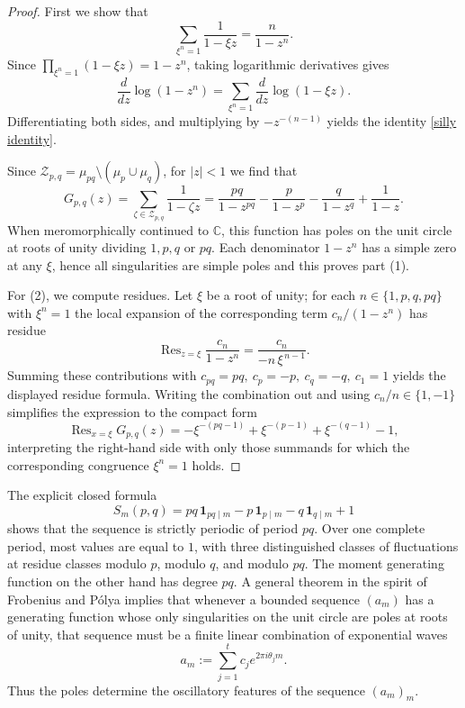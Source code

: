 \documentclass[table]{amsart}
\numberwithin{equation}{section}
\begin{document}
\begin{proof}

\par First we show that \begin{equation}\label{silly identity}
\sum_{\xi^n=1}\frac{1}{1-\xi z}=\frac{n}{1-z^n}.
\end{equation} Since $\prod_{\xi^n=1}(1-\xi z)=1-z^n$, taking logarithmic derivatives gives
\[
\frac{d}{dz}\log(1-z^n)=\sum_{\xi^n=1}\frac{d}{dz}\log(1-\xi z).
\]
Differentiating both sides, and multiplying by \(-z^{-(n-1)}\) yields the identity \eqref{silly identity}.
\par Since
\(\mathcal{Z}_{p,q}=\mu_{pq}\setminus(\mu_p\cup\mu_q)\), for \(|z|<1\) we find that
\[
G_{p,q}(z)=\sum_{\zeta\in\mathcal{Z}_{p,q}}\frac{1}{1-\zeta z}
=\frac{pq}{1-z^{pq}}-\frac{p}{1-z^p}-\frac{q}{1-z^q}+\frac{1}{1-z}.
\]When meromorphically continued to $\mathbb{C}$, this function has poles on the unit circle at roots of unity dividing \(1,p,q\) or \(pq\). Each denominator \(1-z^n\) has a simple zero at any \(\xi\), hence all singularities are simple poles and this proves part (1).
\par For (2), we compute residues. Let \(\xi\) be a root of unity; for each \(n\in\{1,p,q,pq\}\) with \(\xi^n=1\) the local expansion of the corresponding term \(c_n/(1-z^n)\) has residue
\[
\operatorname{Res}_{z=\xi}\frac{c_n}{1-z^n} = \frac{c_n}{-n\,\xi^{\,n-1}}.
\]
Summing these contributions with \(c_{pq}=pq,\ c_p=-p,\ c_q=-q,\ c_1=1\) yields the displayed residue formula. Writing the combination out and using \(c_n/n\in\{1,-1\}\) simplifies the expression to the compact form
\[
\operatorname{Res}_{x=\xi}G_{p,q}(z)
= -\xi^{-(pq-1)}+\xi^{-(p-1)}+\xi^{-(q-1)}-1,
\]
interpreting the right-hand side with only those summands for which the corresponding congruence \(\xi^n=1\) holds.
\end{proof}
The explicit closed formula
\[
S_m(p,q)=pq\,\mathbf{1}_{pq\mid m}-p\,\mathbf{1}_{p\mid m}-q\,\mathbf{1}_{q\mid m}+1
\]
shows that the sequence is strictly periodic of period \(pq\). Over one complete period, most values are equal to \(1\), with three distinguished classes of fluctuations at residue classes modulo \(p\), modulo \(q\), and modulo \(pq\). The moment generating function on the other hand has degree $pq$. A general theorem in the spirit of Frobenius and P\'olya implies that whenever a bounded sequence $(a_m)$ has a generating function whose only singularities on the unit circle are poles at roots of unity, that sequence must be a finite linear combination of exponential waves \[a_m:=\sum_{j=1}^t c_j e^{2\pi i\theta_j m}.\]  Thus the poles determine the oscillatory features of the sequence $(a_m)_m$.
\end{document}
